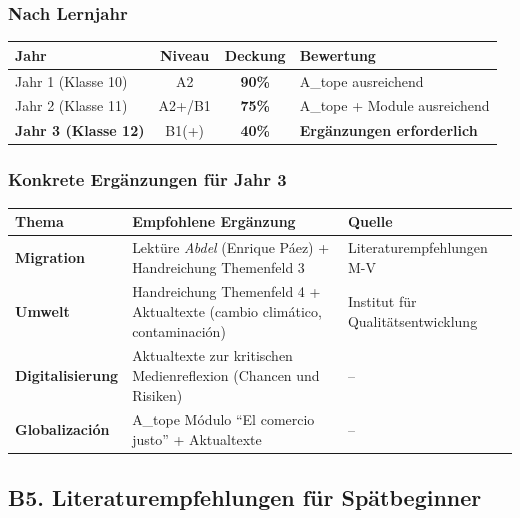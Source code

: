 \documentclass[10pt,a4paper]{article}
\begin{document}
\subsubsection{Nach Lernjahr}

\begin{center}
\small
\begin{tabular}{|l|c|c|p{6cm}|}
\hline
\rowcolor{lightgray}
\textbf{Jahr} & \textbf{Niveau} & \textbf{Deckung} & \textbf{Bewertung} \\
\hline
Jahr 1 (Klasse 10) & A2 & \textcolor{success}{\textbf{90\%}} & A\_tope ausreichend \\
\hline
Jahr 2 (Klasse 11) & A2+/B1 & \textcolor{warning}{\textbf{75\%}} & A\_tope + Module ausreichend \\
\hline
\rowcolor{lightred}
\textbf{Jahr 3 (Klasse 12)} & B1(+) & \textcolor{spanisch}{\textbf{40\%}} & \textbf{Ergänzungen erforderlich} \\
\hline
\end{tabular}
\end{center}

\subsubsection{Konkrete Ergänzungen für Jahr 3}

\begin{center}
\small
\begin{tabular}{|p{4cm}|p{5cm}|p{4cm}|}
\hline
\rowcolor{lightgray}
\textbf{Thema} & \textbf{Empfohlene Ergänzung} & \textbf{Quelle} \\
\hline
\textbf{Migration} & Lektüre \textit{Abdel} (Enrique Páez) + Handreichung Themenfeld 3 & Literaturempfehlungen M-V \\
\hline
\textbf{Umwelt} & Handreichung Themenfeld 4 + Aktualtexte (cambio climático, contaminación) & Institut für Qualitätsentwicklung \\
\hline
\textbf{Digitalisierung} & Aktualtexte zur kritischen Medienreflexion (Chancen und Risiken) & -- \\
\hline
\textbf{Globalización} & A\_tope Módulo ``El comercio justo'' + Aktualtexte & -- \\
\hline
\end{tabular}
\end{center}

\subsection{B5. Literaturempfehlungen für Spätbeginner}
\end{document}
